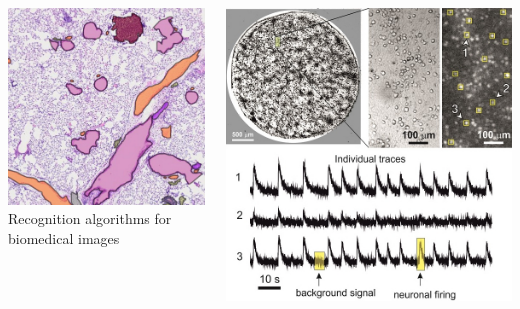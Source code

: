 \documentclass{beamer}
\begin{document}
\begin{frame}
    \centering
    \begin{columns}
        \begin{column}{0.25\textwidth}
            \centering
            \includegraphics[width=\textwidth]{figures/cytomine.png}\\
            \scriptsize Recognition algorithms for biomedical images
        \end{column}
        \begin{column}{0.25\textwidth}
            \centering
            \includegraphics[width=\textwidth]{figures/connectomics.jpg}\\

\end{column}
\end{columns}
\end{frame}
\end{document}
